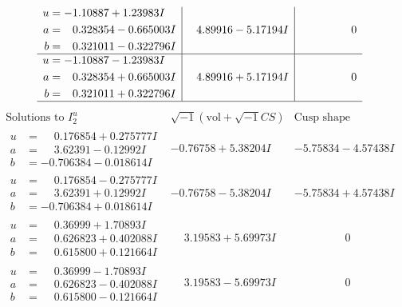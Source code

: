 \documentclass[1p]{elsarticle_modified}
\theoremstyle{definition}
\newcommand{\I}{\sqrt{-1}}
\begin{document}
$$\begin{array}{c|c|c}
\begin{aligned}
u &= -1.10887 + 1.23983 I \\
a &= \phantom{-}0.328354 - 0.665003 I \\
b &= \phantom{-}0.321011 - 0.322796 I\end{aligned}
 & \phantom{-}4.89916 - 5.17194 I & \phantom{-0.000000 } 0 \\ \hline\begin{aligned}
u &= -1.10887 - 1.23983 I \\
a &= \phantom{-}0.328354 + 0.665003 I \\
b &= \phantom{-}0.321011 + 0.322796 I\end{aligned}
 & \phantom{-}4.89916 + 5.17194 I & \phantom{-0.000000 } 0\\
 \hline 
 \end{array}$$\newpage$$\begin{array}{c|c|c}  
\text{Solutions to }I^u_{2}& \I (\text{vol} + \sqrt{-1}CS) & \text{Cusp shape}\\
 \hline 
\begin{aligned}
u &= \phantom{-}0.176854 + 0.275777 I \\
a &= \phantom{-}3.62391 - 0.12992 I \\
b &= -0.706384 - 0.018614 I\end{aligned}
 & -0.76758 + 5.38204 I & -5.75834 - 4.57438 I \\ \hline\begin{aligned}
u &= \phantom{-}0.176854 - 0.275777 I \\
a &= \phantom{-}3.62391 + 0.12992 I \\
b &= -0.706384 + 0.018614 I\end{aligned}
 & -0.76758 - 5.38204 I & -5.75834 + 4.57438 I \\ \hline\begin{aligned}
u &= \phantom{-}0.36999 + 1.70893 I \\
a &= \phantom{-}0.626823 + 0.402088 I \\
b &= \phantom{-}0.615800 + 0.121664 I\end{aligned}
 & \phantom{-}3.19583 + 5.69973 I & \phantom{-0.000000 } 0 \\ \hline\begin{aligned}
u &= \phantom{-}0.36999 - 1.70893 I \\
a &= \phantom{-}0.626823 - 0.402088 I \\
b &= \phantom{-}0.615800 - 0.121664 I\end{aligned}
 & \phantom{-}3.19583 - 5.69973 I & \phantom{-0.000000 } 0 \\ \hline\begin{aligned}

\end{aligned}
\end{array}$$
\end{document}
